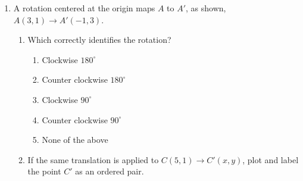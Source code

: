 \begin{enumerate}
\item A rotation centered at the origin maps $A$ to $A'$, as shown, $A(3,1) \rightarrow A'(-1,3)$.
\begin{multicols}{2}
  \begin{enumerate}
    \item Which correctly identifies the rotation?
    \begin{enumerate}[label=(\Alph*)]
      \item Clockwise $180^\circ$
      \item Counter clockwise $180^\circ$
      \item Clockwise $90^\circ$
      \item Counter clockwise $90^\circ$
      \item None of the above
    \end{enumerate} \vspace{2cm}
    \item If the same translation is applied to $C(5,1)\rightarrow C'(x,y)$, plot and label the point $C'$ as an ordered pair.
    \end{enumerate}
    \begin{flushright}
    \end{flushright}
\end{multicols}



\end{enumerate}
